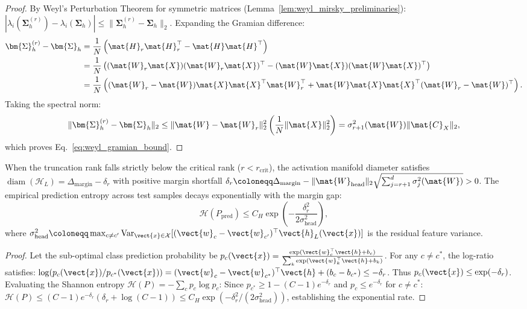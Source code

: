 \begin{proof}
By Weyl's Perturbation Theorem for symmetric matrices (Lemma~\ref{lem:weyl_mirsky_preliminaries}):
$|\lambda_i(\bm{\Sigma}_h^{(r)}) - \lambda_i(\bm{\Sigma}_h)| \le \|\bm{\Sigma}_h^{(r)} - \bm{\Sigma}_h\|_2$.
Expanding the Gramian difference:
\begin{align}
\bm{\Sigma}_h^{(r)} - \bm{\Sigma}_h &= \frac{1}{N} \left( \mat{H}_r \mat{H}_r^\top - \mat{H} \mat{H}^\top \right) \nonumber \\
&= \frac{1}{N} \left( (\mat{W}_r \mat{X}) (\mat{W}_r \mat{X})^\top - (\mat{W} \mat{X}) (\mat{W} \mat{X})^\top \right) \nonumber \\
&= \frac{1}{N} \left( (\mat{W}_r - \mat{W}) \mat{X} \mat{X}^\top \mat{W}_r^\top + \mat{W} \mat{X} \mat{X}^\top (\mat{W}_r - \mat{W})^\top \right).
\end{align}
Taking the spectral norm:
\begin{equation}
\|\bm{\Sigma}_h^{(r)} - \bm{\Sigma}_h\|_2 \le \|\mat{W} - \mat{W}_r\|_2^2 \left( \frac{1}{N}\|\mat{X}\|_2^2 \right) = \sigma_{r+1}^2(\mat{W}) \|\mat{C}_X\|_2,
\end{equation}
which proves Eq.~\eqref{eq:weyl_gramian_bound}.
\end{proof}

\begin{corollary}
\label{cor:entropy_vanishing_rate}
When the truncation rank falls strictly below the critical rank ($r < r_{\text{crit}}$), the activation manifold diameter satisfies $\operatorname{diam}(\mathcal{H}_L) = \Delta_{\text{margin}} - \delta_r$ with positive margin shortfall $\delta_r \coloneqq \Delta_{\text{margin}} - \|\mat{W}_{\text{head}}\|_2 \sqrt{\sum_{j=r+1}^d \sigma_j^2(\mat{W})} > 0$.
The empirical prediction entropy across test samples decays exponentially with the margin gap:
\begin{equation}
\mathcal{H}(P_{\text{pred}}) \le C_H \exp\left( -\frac{\delta_r^2}{2 \sigma_{\text{head}}^2} \right),
\label{eq:entropy_exponential_decay_bound}
\end{equation}
where $\sigma_{\text{head}}^2 \coloneqq \max_{c \ne c'} \operatorname{Var}_{\vect{x} \in \mathcal{X}} [(\vect{w}_c - \vect{w}_{c'})^\top \vect{h}_L(\vect{x})]$ is the residual feature variance.
\end{corollary}

\begin{proof}
Let the sub-optimal class prediction probability be $p_c(\vect{x}) = \frac{\exp(\vect{w}_c^\top \vect{h} + b_c)}{\sum_{k} \exp(\vect{w}_k^\top \vect{h} + b_k)}$.
For any $c \ne c^*$, the log-ratio satisfies:
$\log(p_c(\vect{x}) / p_{c^*}(\vect{x})) = (\vect{w}_c - \vect{w}_{c^*})^\top \vect{h} + (b_c - b_{c^*}) \le -\delta_r$.
Thus $p_c(\vect{x}) \le \exp(-\delta_r)$.
Evaluating the Shannon entropy $\mathcal{H}(P) = -\sum_{c} p_c \log p_c$:
Since $p_{c^*} \ge 1 - (C-1)e^{-\delta_r}$ and $p_c \le e^{-\delta_r}$ for $c \ne c^*$:
$\mathcal{H}(P) \le (C-1) e^{-\delta_r} (\delta_r + \log(C-1)) \le C_H \exp(-\delta_r^2 / (2 \sigma_{\text{head}}^2))$, establishing the exponential rate.
\end{proof}

